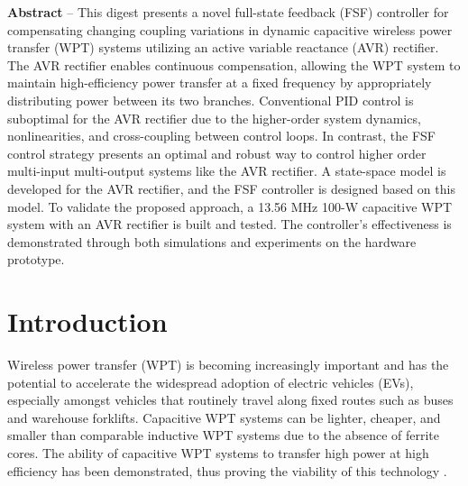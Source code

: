 \documentclass[journal, onecolumn, final, letterpaper, 11pt]{IEEEtran}
\title{\myfont{\textmd{A Full State Feedback Controller for Dynamic Capacitive Wireless Power Transfer Systems}}}
\begin{document}
\maketitle
 
\doublespacing

\vspace{-0.85cm}
\begin{spacing}{1.4}
\noindent \textbf{{\small Abstract}} -- \small{This digest presents a novel full-state feedback (FSF) controller for compensating changing coupling variations in dynamic capacitive wireless power transfer (WPT) systems utilizing an active variable reactance (AVR) rectifier. The AVR rectifier enables continuous compensation, allowing the WPT system to maintain high-efficiency power transfer at a fixed frequency by appropriately distributing power between its two branches. Conventional PID control is suboptimal for the AVR rectifier due to the higher-order system dynamics, nonlinearities, and cross-coupling between control loops. In contrast, the FSF control strategy presents an optimal and robust way to control higher order multi-input multi-output systems like the AVR rectifier. A state-space model is developed for the AVR rectifier, and the FSF controller is designed based on this model. To validate the proposed approach, a 13.56 MHz 100-W capacitive WPT system with an AVR rectifier is built and tested. The controller’s effectiveness is demonstrated through both simulations and experiments on the hardware prototype.}
\end{spacing}

\vspace{-0.15cm}

\section{Introduction}

Wireless power transfer (WPT) is becoming increasingly important and has the potential to accelerate the widespread adoption of electric vehicles (EVs), especially amongst vehicles that routinely travel along fixed routes such as buses and warehouse forklifts. Capacitive WPT systems can be lighter, cheaper, and smaller than comparable inductive WPT systems due to the absence of ferrite cores. The ability of capacitive WPT systems to transfer high power at high efficiency has been demonstrated, thus proving the viability of this technology \cite{2023_Maji_WPTCE}.
\end{document}
